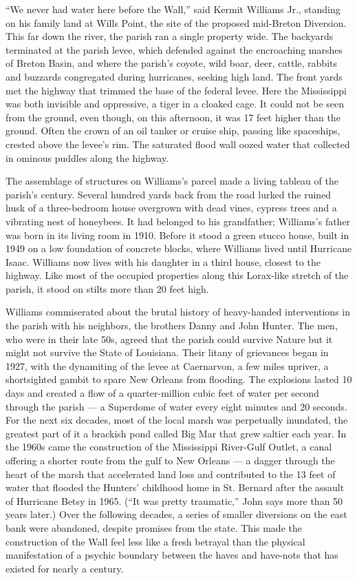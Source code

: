``We never had water here before the Wall,'' said Kermit Williams Jr.,
standing on his family land at Wills Point, the site of the proposed
mid-Breton Diversion. This far down the river, the parish ran a single
property wide. The backyards terminated at the parish levee, which
defended against the encroaching marshes of Breton Basin, and where the
parish's coyote, wild boar, deer, cattle, rabbits and buzzards
congregated during hurricanes, seeking high land. The front yards met
the highway that trimmed the base of the federal levee. Here the
Mississippi was both invisible and oppressive, a tiger in a cloaked
cage. It could not be seen from the ground, even though, on this
afternoon, it was 17 feet higher than the ground. Often the crown of an
oil tanker or cruise ship, passing like spaceships, crested above the
levee's rim. The saturated flood wall oozed water that collected in
ominous puddles along the highway.

The assemblage of structures on Williams's parcel made a living tableau
of the parish's century. Several hundred yards back from the road lurked
the ruined husk of a three-bedroom house overgrown with dead vines,
cypress trees and a vibrating nest of honeybees. It had belonged to his
grandfather; Williams's father was born in its living room in 1910.
Before it stood a green stucco house, built in 1949 on a low foundation
of concrete blocks, where Williams lived until Hurricane Isaac. Williams
now lives with his daughter in a third house, closest to the highway.
Like most of the occupied properties along this Lorax-like stretch of
the parish, it stood on stilts more than 20 feet high.

Williams commiserated about the brutal history of heavy-handed
interventions in the parish with his neighbors, the brothers Danny and
John Hunter. The men, who were in their late 50s, agreed that the parish
could survive Nature but it might not survive the State of Louisiana.
Their litany of grievances began in 1927, with the dynamiting of the
levee at Caernarvon, a few miles upriver, a shortsighted gambit to spare
New Orleans from flooding. The explosions lasted 10 days and created a
flow of a quarter-million cubic feet of water per second through the
parish --- a Superdome of water every eight minutes and 20 seconds. For
the next six decades, most of the local marsh was perpetually inundated,
the greatest part of it a brackish pond called Big Mar that grew saltier
each year. In the 1960s came the construction of the Mississippi
River-Gulf Outlet, a canal offering a shorter route from the gulf to New
Orleans --- a dagger through the heart of the marsh that accelerated
land loss and contributed to the 13 feet of water that flooded the
Hunters' childhood home in St. Bernard after the assault of Hurricane
Betsy in 1965. (``It was pretty traumatic,'' John says more than 50
years later.) Over the following decades, a series of smaller diversions
on the east bank were abandoned, despite promises from the state. This
made the construction of the Wall feel less like a fresh betrayal than
the physical manifestation of a psychic boundary between the haves and
have-nots that has existed for nearly a century.

